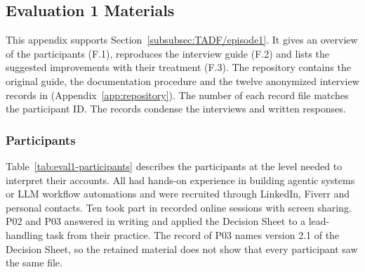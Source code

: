 
\subsection{Evaluation 1 Materials}
\label{app:eval1}

This appendix supports Section~\ref{subsubsec:TADF/episode1}. It gives an overview of the participants (F.1), reproduces the interview guide (F.2) and lists the suggested improvements with their treatment (F.3). The repository contains the original guide, the documentation procedure and the twelve anonymized interview records in  (Appendix~\ref{app:repository}). The number of each record file matches the participant ID. The records condense the interviews and written responses.

\subsubsection{Participants}
\label{app:eval1/participants}

Table~\ref{tab:eval1-participants} describes the participants at the level needed to interpret their accounts. All had hands-on experience in building agentic systems or LLM workflow automations and were recruited through LinkedIn, Fiverr and personal contacts. Ten took part in recorded online sessions with screen sharing. P02 and P03 answered in writing and applied the Decision Sheet to a lead-handling task from their practice. The record of P03 names version 2.1 of the Decision Sheet, so the retained material does not show that every participant saw the same file.

